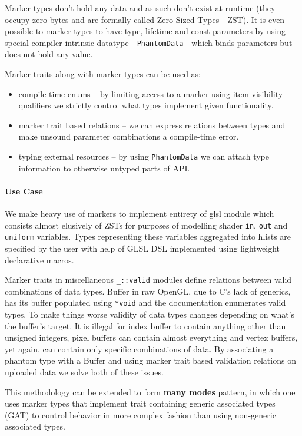 Marker types don't hold any data and as such don't exist at runtime (they occupy zero bytes and are formally called Zero Sized Types - ZST).
It is even possible to marker types to have type, lifetime and const parameters by using special compiler intrinsic datatype - \texttt{PhantomData} - which binds parameters but does not hold any value.

Marker traits along with marker types can be used as:
\begin{itemize}
    \item compile-time enums -- by limiting access to a marker using item visibility qualifiers we strictly control what types implement given functionality.
    \item marker trait based relations -- we can express relations between types and make unsound parameter combinations a compile-time error.
    \item typing external resources -- by using \texttt{PhantomData} we can attach type information to otherwise untyped parts of API.
\end{itemize}

\paragraph{Use Case}

We make heavy use of markers to implement entirety of glsl module which consists almost elusively of ZSTs for purposes of modelling shader \texttt{in}, \texttt{out} and \texttt{uniform} variables.
Types representing these variables aggregated into hlists are specified by the user with help of GLSL DSL implemented using lightweight declarative macros.

Marker traits in miscellaneous \texttt{\_::valid} modules define relations between valid combinations of data types. Buffer in raw OpenGL, due to C's lack of generics, has its buffer populated using \texttt{*void} 
and the documentation enumerates valid types. To make things worse validity of data types changes depending on what's the buffer's target.
It is illegal for index buffer to contain anything other than unsigned integers, pixel buffers can contain almost everything and vertex buffers, yet again, can contain only specific combinations of data.
By associating a phantom type with a Buffer and using marker trait based validation relations on uploaded data we solve both of these issues.

This methodology can be extended to form \textbf{many modes} pattern, in which one uses marker types that implement trait 
containing generic associated types (GAT) to control behavior in more complex fashion than using non-generic associated types.

